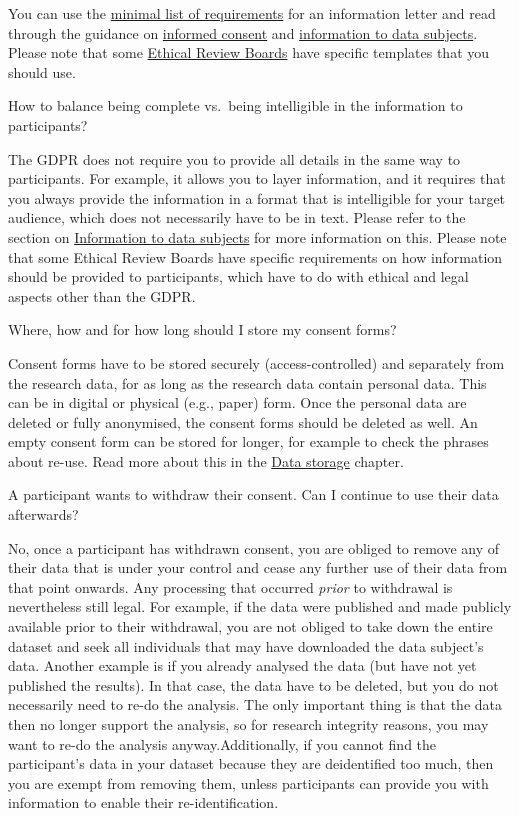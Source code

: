 \documentclass[
]{book}
\begin{document}
You can use the \href{https://www.uu.nl/sites/default/files/RDM_Support_Template_Information_letter.pdf}{minimal list of requirements} for an information letter and read through the guidance on \protect\hyperlink{informed-consent-forms}{informed consent} and \protect\hyperlink{privacy-notices}{information to data subjects}. Please note that some \href{https://intranet.uu.nl/en/knowledgebase/ethics-assessment}{Ethical Review Boards} have specific templates that you should use.

How to balance being complete vs.~being intelligible in the information to participants?

The GDPR does not require you to provide all details in the same way to participants. For example, it allows you to layer information, and it requires that you always provide the information in a format that is intelligible for your target audience, which does not necessarily have to be in text. Please refer to the section on \protect\hyperlink{privacy-notices}{Information to data subjects} for more information on this. Please note that some Ethical Review Boards have specific requirements on how information should be provided to participants, which have to do with ethical and legal aspects other than the GDPR.

Where, how and for how long should I store my consent forms?

Consent forms have to be stored securely (access-controlled) and separately from the research data, for as long as the research data contain personal data. This can be in digital or physical (e.g., paper) form. Once the personal data are deleted or fully anonymised, the consent forms should be deleted as well. An empty consent form can be stored for longer, for example to check the phrases about re-use. Read more about this in the \protect\hyperlink{data-storage}{Data storage} chapter.

A participant wants to withdraw their consent. Can I continue to use their data afterwards?

No, once a participant has withdrawn consent, you are obliged to remove any of their data that is under your control and cease any further use of their data from that point onwards. Any processing that occurred \emph{prior} to withdrawal is nevertheless still legal. For example, if the data were published and made publicly available prior to their withdrawal, you are not obliged to take down the entire dataset and seek all individuals that may have downloaded the data subject's data. Another example is if you already analysed the data (but have not yet published the results). In that case, the data have to be deleted, but you do not necessarily need to re-do the analysis. The only important thing is that the data then no longer support the analysis, so for research integrity reasons, you may want to re-do the analysis anyway.Additionally, if you cannot find the participant's data in your dataset because they are deidentified too much, then you are exempt from removing them, unless participants can provide you with information to enable their re-identification.
\end{document}
